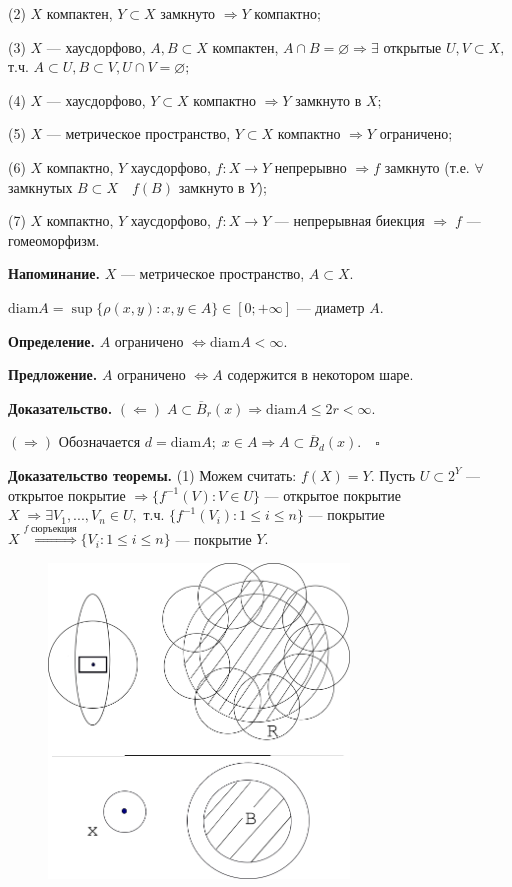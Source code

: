 \documentclass[12pt,a4paper]{article}
\begin{document}
(2) $X$ компактен, $Y \subset X$ замкнуто $\Rightarrow Y$ компактно;

(3) $X$ --- хаусдорфово, $A, B \subset X$ компактен, $A \cap B = \varnothing \Rightarrow \exists$ открытые $U, V \subset X,$ т.ч. $A \subset U, B \subset V, U \cap V = \varnothing;$

(4) $X$ --- хаусдорфово, $Y \subset X$ компактно $\Rightarrow Y$ замкнуто в $X;$

(5) $X$ --- метрическое пространство, $Y \subset X$ компактно $\Rightarrow Y$ ограничено;

(6) $X$ компактно, $Y$ хаусдорфово, $f: X \to Y$ непрерывно $\Rightarrow f$ замкнуто (т.е. $\forall$ замкнутых $B \subset X \quad f(B)$ замкнуто в $Y$);

(7) $X$ компактно, $Y$ хаусдорфово, $f: X \to Y$ --- непрерывная биекция $\Rightarrow \; f$ --- гомеоморфизм. 

\textbf{Напоминание.} $X$ --- метрическое пространство, $A \subset X.$

$\text{diam} A = \sup\{\rho(x, y)\!: x, y \in A\} \in [0; +\infty]$ --- диаметр $A.$ 

\textbf{Определение.} $A$ ограничено $\Leftrightarrow \text{diam} A < \infty.$ 

\textbf{Предложение.} $A$ ограничено $\Leftrightarrow A$ содержится в некотором шаре. 

\textbf{Доказательство.} $(\Leftarrow) \; A \subset \overline{B}_{r}(x) \Rightarrow \text{diam} A \leq 2r < \infty.$

$(\Rightarrow)$ Обозначается $d = \text{diam} A; \; x \in A \Rightarrow A \subset \overline{B}_{d}(x). \quad \square$ 

\textbf{Доказательство теоремы.} (1) Можем считать: $f(X) = Y.$ Пусть $U \subset 2^{Y}$ --- открытое покрытие $\Rightarrow \{f^{-1}(V)\!: V \in U\}$ --- открытое покрытие $X \; \Rightarrow \exists V_{1}, ..., V_{n} \in U,$ т.ч. $\{f^{-1}(V_{i})\!: 1 \leq i \leq n\}$ --- покрытие $X \overset{f \; \text{сюръекция}}{\Rightarrow} \{V_{i}\!: 1 \leq i \leq n\}$ --- покрытие $Y.$

\begin{figure}
	\includegraphics[width = 8cm]{lect9_2.png}
\end{figure}
\end{document}
